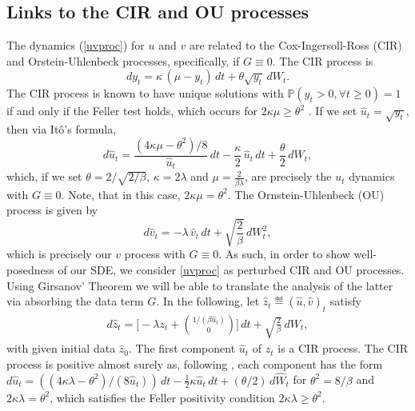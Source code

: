 \documentclass[11pt, twoside]{report}
\begin{document}
\subsection{Links to the CIR and OU processes}
The dynamics (\ref{uvproc}) for $u$ and $v$ are related to the Cox-Ingersoll-Ross (CIR) and Orstein-Uhlenbeck processes, specifically, if $G \equiv 0$. The CIR process is
\begin{equation}\label{eq:cir1}
    dy_t = \kappa\,(\mu-y_t) \,dt + \theta \sqrt{y_t} \,dW_t.
\end{equation}
The CIR process is known to have unique solutions with $\mathbb{P}(y_t > 0, \forall t \geq 0) = 1$ if and only if the Feller test holds, which occurs for $2\kappa \mu \geq \theta^2$ \cite{Gikhman2011}.  If we set $\hat{u}_t = \sqrt{y_t}$, then via It\^{o}'s formula,
\begin{equation}\label{eq:cir_2}
    d\hat u_t = \frac{(4\kappa \mu-\theta^2)/8}{\hat u_t}\,dt -\frac{\kappa}{2}\,\hat u_t \,dt + \frac{\theta}{2} \,dW_t,
\end{equation}
which, if we set $\theta = 2/\sqrt{2/\beta}$, $\kappa = 2\lambda$ and $\mu = \frac{2}{\beta \lambda}$, are precisely the $u_t$ dynamics with $G \equiv 0$. Note, that in this case, $2\kappa \mu = \theta^2$. The Ornstein-Uhlenbeck (OU) process is given by
$$
d\hat v_t =-\lambda\, \hat v_t\, dt + \sqrt{\frac{2}{\beta}}\,dW_t^2,
$$
which is precisely our $v$ process with $G \equiv 0$. As such, in order to show well-posedness of our SDE, we consider \ref{uvproc} as perturbed CIR and OU processes. Using Girsanov' Theorem we will be able to translate the analysis of the latter via absorbing the data term $G$. In the following, let $\hat z_t \eqdef (\hat u,\hat v)_t$ satisfy
\begin{align}\label{potential_free_sde_z}
d \hat z_t = \biggl[-\lambda z_t + \binom{1/(\beta \hat u_t)}{0} \biggr]\,dt + \sqrt{\frac{2}{\beta}} \,d  W_t,
\end{align}
with given initial data $\hat z_0$. The first component $\hat u_t$ of $\hat z_t$ is a CIR process. The CIR process is positive almost surely as, following \cite{Dereich2011-tp}, each component has the form $d\hat u_t = ((4\kappa \lambda - \theta^2)/(8\hat u_t))\,dt - \frac12 \kappa \hat u_t\, dt + (\theta/2)\,d\hat W_t$ for $\theta^2 = 8/\beta$ and $2\kappa\lambda = \theta^2$, which satisfies the Feller positivity condition $2\kappa\lambda\geq \theta^2$.%
\end{document}
